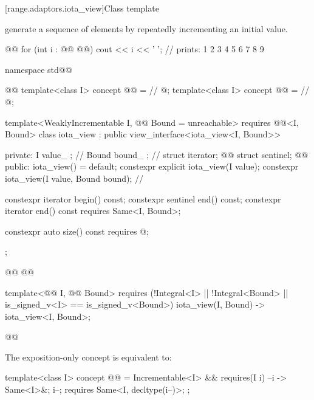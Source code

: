 [range.adaptors.iota_view]{Class template }

\pnum
{}   generate a
sequence of elements by repeatedly incrementing an initial value.

\pnum
\begin{example}
\begin{codeblock}
@@
for (int i : @@ @@)
  cout << i << ' '; // prints: 1 2 3 4 5 6 7 8 9
\end{codeblock}
\end{example}

\begin{codeblock}
namespace std@@ { @@
  template<class I>
  concept @@ = // \expos
    @\seebelownc@;
  template<class I>
  concept @@ = // \expos
    @\seebelownc@;

  template<WeaklyIncrementable I, @@ Bound = unreachable>
    requires @@<I, Bound>
  class iota_view : public view_interface<iota_view<I, Bound>> {
  private:
    I value_ {};     // \expos
    Bound bound_ {}; // \expos
    struct iterator; @\newtxt{// \expos}@
    struct sentinel; @\newtxt{// \expos}@
  public:
    iota_view() = default;
    constexpr explicit iota_view(I value);
    constexpr iota_view(I value, Bound bound); // \seebelow

    constexpr iterator begin() const;
    constexpr sentinel end() const;
    constexpr iterator end() const requires Same<I, Bound>;

    constexpr auto size() const requires @\seebelownc@;
  };

  @@
  @@

  template<@@ I, @@ Bound>
    requires
      (!Integral<I> || !Integral<Bound> || is_signed_v<I> == is_signed_v<Bound>)
  iota_view(I, Bound) -> iota_view<I, Bound>;
}@\oldtxt{\}}@
\end{codeblock}

\pnum
The exposition-only  concept is equivalent to:
\begin{itemdecl}
template<class I>
concept @@ =
  Incrementable<I> && requires(I i) {
    { --i } -> Same<I>&;
    i--; requires Same<I, decltype(i--)>;
  };
\end{itemdecl}

